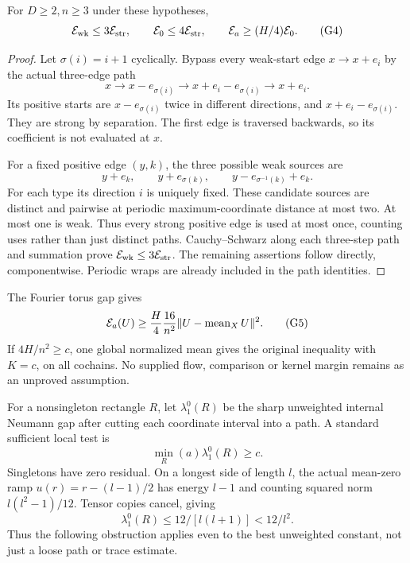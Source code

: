 \begin{lemma}\label{lem:geo-detour}
For $D\geq2,n\geq3$ under these hypotheses,
\[
 \mathcal E_{\rm wk}\leq3\mathcal E_{\rm str},\qquad
 \mathcal E_0\leq4\mathcal E_{\rm str},\qquad \mathcal E_a\geq(H/4)\mathcal E_0.         \tag{G4}
\]
\end{lemma}
\begin{proof}
Let $\sigma(i)=i+1$ cyclically. Bypass every weak-start edge $x\to x+e_i$
by the actual three-edge path
\[
 x\longrightarrow x-e_{\sigma(i)}
 \longrightarrow x+e_i-e_{\sigma(i)}\longrightarrow x+e_i.
\]
Its positive starts are $x-e_{\sigma(i)}$ twice in different directions,
and $x+e_i-e_{\sigma(i)}$. They are strong by separation. The first edge
is traversed backwards, so its coefficient is not evaluated at $x$.

For a fixed positive edge $(y,k)$, the three possible weak sources are
\[
 y+e_k,\qquad y+e_{\sigma(k)},\qquad
 y-e_{\sigma^{-1}(k)}+e_k.
\]
For each type its direction $i$ is uniquely fixed. These candidate sources
are distinct and pairwise at periodic maximum-coordinate distance at most
two. At most one is weak. Thus every strong positive edge is used at most
once, counting uses rather than just distinct paths. Cauchy--Schwarz along
each three-step path and summation prove $\mathcal E_{\rm wk}\leq3\mathcal E_{\rm str}$.
The remaining assertions follow directly, componentwise. Periodic wraps
are already included in the path identities.
\end{proof}
The Fourier torus gap gives
\[
 \mathcal E_a(U)\geq\frac H4\frac{16}{n^2}\|U-\operatorname{mean}_XU\|^2.
                                                                    \tag{G5}
\]
If $4H/n^2\geq c$, one global normalized mean gives the original inequality
with $K=c$, on all cochains. No supplied flow, comparison or kernel margin
remains as an unproved assumption.

For a nonsingleton rectangle $R$, let $\lambda_1^0(R)$ be the sharp
unweighted internal Neumann gap after cutting each coordinate interval
into a path. A standard sufficient local test is
\[
       \min_R(a)\lambda_1^0(R)\geq c.                      \tag{G6}
\]
Singletons have zero residual. On a longest side of length $l$, the actual
mean-zero ramp $u(r)=r-(l-1)/2$ has energy $l-1$ and counting squared norm
$l(l^2-1)/12$. Tensor copies cancel, giving
\[
       \lambda_1^0(R)\leq12/[l(l+1)]<12/l^2.              \tag{G7}
\]
Thus the following obstruction applies even to the best unweighted
constant, not just a loose path or trace estimate.

